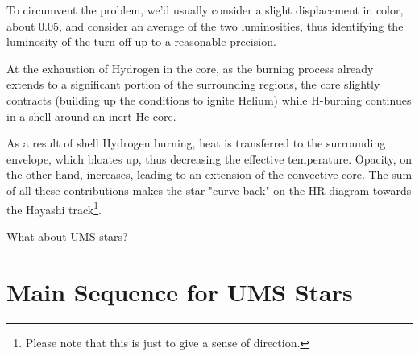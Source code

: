\par To circumvent the problem, we'd usually consider a slight displacement in color, about 0.05, and consider an average of the two luminosities, thus identifying the luminosity of the turn off up to a reasonable precision.
\par At the exhaustion of Hydrogen in the core, as the burning process already extends to a significant portion of the surrounding regions, the core slightly contracts (building up the conditions to ignite Helium) while H-burning continues in a shell around an inert He-core.
\par As a result of shell Hydrogen burning, heat is transferred to the surrounding envelope, which bloates up, thus decreasing the effective temperature. Opacity, on the other hand, increases, leading to an extension of the convective core. The sum of all these contributions makes the star "curve back" on the HR diagram towards the Hayashi track\footnote{Please note that this is just to give a sense of direction.}.
\par What about UMS stars?

\section{Main Sequence for UMS Stars}

